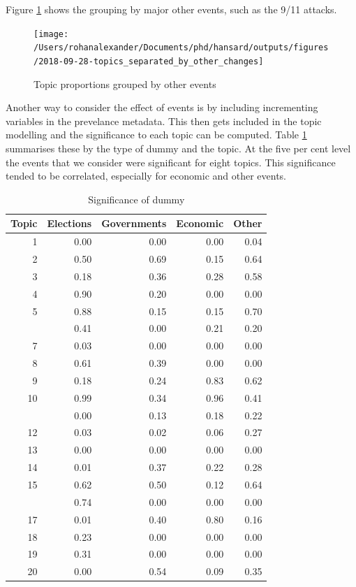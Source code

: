 \documentclass[12pt,]{article}
\theoremstyle{definition}
\theoremstyle{definition}
\theoremstyle{definition}
\theoremstyle{remark}
\begin{document}
Figure \ref{fig:otherevents} shows the grouping by major other events,
such as the 9/11 attacks.

\begin{figure}
\texttt{[image: /Users/rohanalexander/Documents/phd/hansard/outputs/figures/2018-09-28-topics\_separated\_by\_other\_changes]} \caption{Topic proportions grouped by other events}\label{fig:otherevents}
\end{figure}

Another way to consider the effect of events is by including
incrementing variables in the prevelance metadata. This then gets
included in the topic modelling and the significance to each topic can
be computed. Table \ref{tab:dodgysignificances} summarises these by the
type of dummy and the topic. At the five per cent level the events that
we consider were significant for eight topics. This significance tended
to be correlated, especially for economic and other events.

\begin{table}

\caption{\label{tab:dodgysignificances}Significance of dummy}
\centering
\fontsize{12}{14}\selectfont
\begin{tabular}[t]{rrrrr}
\toprule
Topic & Elections & Governments & Economic & Other\\
\midrule
1 & 0.00 & 0.00 & 0.00 & 0.04\\
2 & 0.50 & 0.69 & 0.15 & 0.64\\
3 & 0.18 & 0.36 & 0.28 & 0.58\\
4 & 0.90 & 0.20 & 0.00 & 0.00\\
5 & 0.88 & 0.15 & 0.15 & 0.70\\
\addlinespace
6 & 0.41 & 0.00 & 0.21 & 0.20\\
7 & 0.03 & 0.00 & 0.00 & 0.00\\
8 & 0.61 & 0.39 & 0.00 & 0.00\\
9 & 0.18 & 0.24 & 0.83 & 0.62\\
10 & 0.99 & 0.34 & 0.96 & 0.41\\
\addlinespace
11 & 0.00 & 0.13 & 0.18 & 0.22\\
12 & 0.03 & 0.02 & 0.06 & 0.27\\
13 & 0.00 & 0.00 & 0.00 & 0.00\\
14 & 0.01 & 0.37 & 0.22 & 0.28\\
15 & 0.62 & 0.50 & 0.12 & 0.64\\
\addlinespace
16 & 0.74 & 0.00 & 0.00 & 0.00\\
17 & 0.01 & 0.40 & 0.80 & 0.16\\
18 & 0.23 & 0.00 & 0.00 & 0.00\\
19 & 0.31 & 0.00 & 0.00 & 0.00\\
20 & 0.00 & 0.54 & 0.09 & 0.35\\
\bottomrule
\end{tabular}
\end{table}
\end{document}
